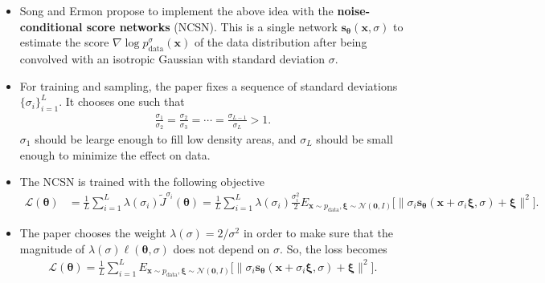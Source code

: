 \documentclass[10pt]{article}
\newcommand{\ve}[1]{\mathbf{#1}}
\newcommand{\mrm}[1]{\mathrm{#1}}
\newcommand{\ves}[1]{\boldsymbol{#1}}
\newcommand{\mcal}[1]{\mathcal{#1}}
\begin{document}
\begin{itemize}
  \item Song and Ermon propose to implement the above idea with the {\bf noise-conditional score networks} (NCSN). This is a single network $\ve{s}_{\ves{\theta}}(\ve{x}, \sigma)$ to estimate the score $\nabla \log p^\sigma_{\mrm{data}}(\ve{x})$ of the data distribution after being convolved with an isotropic Gaussian with standard deviation $\sigma$.

  \item For training and sampling, the paper fixes a sequence of standard deviations $\{ \sigma_i \}_{i=1}^L$. It chooses one such that
  \begin{align*}
    \frac{\sigma_1}{\sigma_2} = \frac{\sigma_2}{\sigma_3} = \dotsb = \frac{\sigma_{L-1}}{\sigma_L} > 1.
  \end{align*}
  $\sigma_1$ should be learge enough to fill low density areas, and $\sigma_L$ should be small enough to minimize the effect on data.

  \item The NCSN is trained with the following objective
  \begin{align*}
    \mcal{L}(\ves{\theta}) 
    &= \frac{1}{L} \sum_{i=1}^L \lambda(\sigma_i) \widetilde{J}^{\sigma_i} (\ves{\theta})
    = \frac{1}{L} \sum_{i=1}^L \lambda(\sigma_i) \frac{\sigma_i^2}{2}E_{\ve{x}\sim p_{\mrm{data}}, \ves{\xi} \sim \mcal{N}(\ve{0},I)} \big[ \big\| \sigma_i \ve{s}_{\ves{\theta}}(\ve{x} + \sigma_i \ves{\xi},\sigma) + \ves{\xi} \big\|^2 \big].
  \end{align*}  
  
  \item The paper chooses the weight $\lambda(\sigma) = 2/\sigma^2$ in order to make sure that the magnitude of $\lambda(\sigma) \ell(\ves{\theta},\sigma)$ does not depend on $\sigma$. So, the loss becomes
  \begin{align} \label{eqn:ncsn-loss}
    \mcal{L}(\ves{\theta}) 
    = \frac{1}{L} \sum_{i=1}^L E_{\ve{x}\sim p_{\mrm{data}}, \ves{\xi} \sim \mcal{N}(\ve{0},I)} \big[ \big\| \sigma_i \ve{s}_{\ves{\theta}}(\ve{x} + \sigma_i \ves{\xi},\sigma) + \ves{\xi} \big\|^2 \big].
  \end{align}


\end{itemize}
\end{document}
